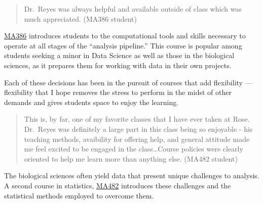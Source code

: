 \documentclass[
  letterpaper,
  DIV=11,
  numbers=noendperiod]{scrreprt}
\begin{document}
\begin{quote}
Dr.~Reyes was always helpful and available outside of class which was
much appreciated. (MA386 student)
\end{quote}

\begin{tcolorbox}[enhanced jigsaw, coltitle=black, colframe=quarto-callout-note-color-frame, opacityback=0, rightrule=.15mm, bottomrule=.15mm, leftrule=.75mm, bottomtitle=1mm, colbacktitle=quarto-callout-note-color!10!white, breakable, titlerule=0mm, title=\textcolor{quarto-callout-note-color}{\faInfo}\hspace{0.5em}{MA386 Statistical Programming}, left=2mm, toptitle=1mm, toprule=.15mm, colback=white, arc=.35mm, opacitybacktitle=0.6]

\href{https://reyesem.github.io/ma386sample.html}{MA386} introduces
students to the computational tools and skills necessary to operate at
all stages of the ``analysis pipeline.'' This course is popular among
students seeking a minor in Data Science as well as those in the
biological sciences, as it prepares them for working with data in their
own projects.

\end{tcolorbox}

Each of these decisions has been in the pursuit of courses that add
flexibility --- flexibility that I hope removes the stress to perform in
the midst of other demands and gives students space to enjoy the
learning.

\begin{quote}
This is, by far, one of my favorite classes that I have ever taken at
Rose. Dr.~Reyes was definitely a large part in this class being so
enjoyable - his teaching methods, avaibility for offering help, and
general attitude made me feel excited to be engaged in the
class\ldots Course policies were clearly oriented to help me learn more
than anything else. (MA482 student)
\end{quote}

\begin{tcolorbox}[enhanced jigsaw, coltitle=black, colframe=quarto-callout-note-color-frame, opacityback=0, rightrule=.15mm, bottomrule=.15mm, leftrule=.75mm, bottomtitle=1mm, colbacktitle=quarto-callout-note-color!10!white, breakable, titlerule=0mm, title=\textcolor{quarto-callout-note-color}{\faInfo}\hspace{0.5em}{MA482 Biostatistics}, left=2mm, toptitle=1mm, toprule=.15mm, colback=white, arc=.35mm, opacitybacktitle=0.6]

The biological sciences often yield data that present unique challenges
to analysis. A second course in statistics,
\href{https://reyesem.github.io/ma482sample.html}{MA482} introduces
these challenges and the statistical methods employed to overcome them.

\end{tcolorbox}
\end{document}
